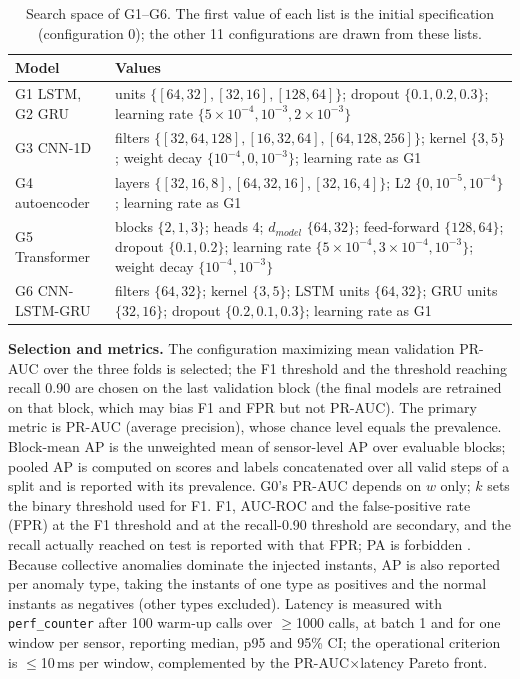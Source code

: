 \documentclass[conference]{IEEEtran}
\begin{document}
\begin{table}[t]
\centering
\caption{Search space of G1--G6. The first value of each list is the initial
specification (configuration 0); the other 11 configurations are drawn from
these lists.}
\label{tab:ranges}
\footnotesize
\setlength{\tabcolsep}{3pt}
\renewcommand{\arraystretch}{0.9}
\begin{tabular}{@{}p{}p{}@{}}
\toprule
Model & Values \\
\midrule
G1 LSTM, G2 GRU & units $\{[64,32],[32,16],[128,64]\}$; dropout $\{0.1,0.2,0.3\}$; learning rate $\{5\!\times\!10^{-4},10^{-3},2\!\times\!10^{-3}\}$ \\
G3 CNN-1D & filters $\{[32,64,128],[16,32,64],[64,128,256]\}$; kernel $\{3,5\}$; weight decay $\{10^{-4},0,10^{-3}\}$; learning rate as G1 \\
G4 autoencoder & layers $\{[32,16,8],[64,32,16],[32,16,4]\}$; L2 $\{0,10^{-5},10^{-4}\}$; learning rate as G1 \\
G5 Transformer & blocks $\{2,1,3\}$; heads 4; $d_{model}$ $\{64,32\}$; feed-forward $\{128,64\}$; dropout $\{0.1,0.2\}$; learning rate $\{5\!\times\!10^{-4},3\!\times\!10^{-4},10^{-3}\}$; weight decay $\{10^{-4},10^{-3}\}$ \\
G6 CNN-LSTM-GRU & filters $\{64,32\}$; kernel $\{3,5\}$; LSTM units $\{64,32\}$; GRU units $\{32,16\}$; dropout $\{0.2,0.1,0.3\}$; learning rate as G1 \\
\bottomrule
\end{tabular}
\end{table}

\textbf{Selection and metrics.} The configuration maximizing mean
validation PR-AUC over the three folds is selected; the F1 threshold and the
threshold reaching recall 0.90 are chosen on the last validation block (the
final models are retrained on that block, which may bias F1 and FPR but not
PR-AUC). The primary metric is PR-AUC (average precision), whose chance level
equals the prevalence. Block-mean AP is the unweighted mean of sensor-level
AP over evaluable blocks; pooled AP is computed on scores and labels
concatenated over all valid steps of a split and is reported with its
prevalence. G0's PR-AUC depends on $w$ only; $k$ sets the binary threshold
used for F1. F1, AUC-ROC and the false-positive rate (FPR) at the F1
threshold and at the recall-0.90 threshold are secondary, and the recall
actually reached on test is reported with that FPR; PA is forbidden
\cite{kim2022rigorous,sorbo2024navigating}. Because collective anomalies
dominate the injected instants, AP is also reported per anomaly type, taking
the instants of one type as positives and the normal instants as negatives
(other types excluded). Latency is measured with \texttt{perf\_counter}
after 100 warm-up calls over $\geq$1000 calls, at batch 1 and for one window
per sensor, reporting median, p95 and 95\% CI; the operational criterion is
$\leq$10\,ms per window, complemented by the PR-AUC$\times$latency Pareto
front.
\end{document}
